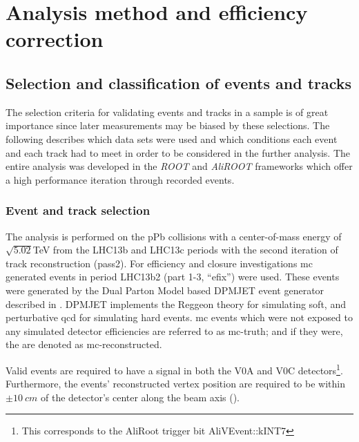 \chapter{Analysis method and efficiency correction}
\label{chap:methods}



\section{Selection and classification of events and tracks}
\label{sec:event_track_selection}
The selection criteria for validating events and tracks in a sample is of great importance since later measurements may be biased by these selections. The following describes which data sets were used and which conditions each event and each track had to meet in order to be considered in the further analysis. The entire analysis was developed in the \emph{ROOT} and \emph{AliROOT} frameworks which offer a high performance iteration through recorded events. 
 


\subsection{Event and track selection}
\label{sec:event_selection}
The analysis is performed on the \gls{pPb} collisions with a center-of-mass energy of $\sqrt{5.02}$\si{TeV} from the LHC13b and LHC13c periods with the second iteration of track reconstruction (pass2). For efficiency and closure investigations \gls{mc} generated events in period LHC13b2 (part 1-3, ``efix'')  were used. These events were generated by the Dual Parton Model based DPMJET event generator described in \cite{Roesler2000}. DPMJET implements the Reggeon theory for simulating soft, and perturbative \gls{qcd} for simulating hard events. \gls{mc} events which were not exposed to any simulated detector efficiencies are referred to as \gls{mc}-truth; and if they were, the are denoted as \gls{mc}-reconstructed.

Valid events are required to have a signal in both the V0A and V0C detectors\footnote{This corresponds to the AliRoot trigger bit AliVEvent::kINT7}. Furthermore, the events' reconstructed vertex position are required to be within $\pm \SI{10}{cm}$ of the detector's center along the beam axis (\zvtx).

